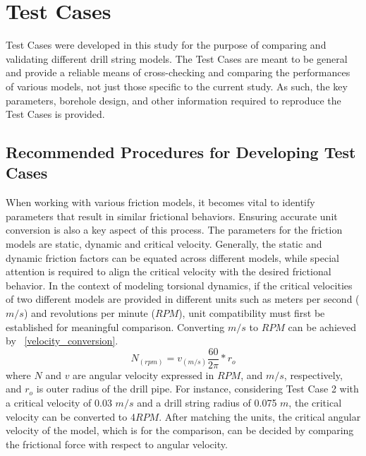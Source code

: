 \chapter{Test Cases}
\label{ch:testcases}
Test Cases were developed in this study for the purpose of comparing and validating different drill string models.  The Test Cases are meant to be general and provide a reliable means of cross-checking and comparing the performances of various models, not just those specific to the current study.  As such, the key parameters, borehole design, and other information required to reproduce the Test Cases is provided.

\section{Recommended Procedures for Developing Test Cases}
\notfinished{}
When working with various friction models, it becomes vital to identify parameters that result in similar frictional behaviors. Ensuring accurate unit conversion is also a key aspect of this process. The parameters for the friction models are static, dynamic and critical velocity. Generally, the static and dynamic friction factors can be equated across different models, while special attention is required to align the critical velocity with the desired frictional behavior. In the context of modeling torsional dynamics, if the critical velocities of two different models are provided in different units such as meters per second ($m/s$) and revolutions per minute ($RPM$), unit compatibility must first be established for meaningful comparison. Converting $m/s$ to $RPM$ can be achieved by \equationname~\ref{velocity_conversion}.
\begin{equation}\label{velocity_conversion}
  N_{(rpm)}=v_{(m/s)}\frac{60}{2\pi}*r_o
\end{equation}
where $N$ and $v$ are angular velocity expressed in $RPM$, and $m/s$, respectively, and $r_o$ is outer radius of the drill pipe. For instance, considering Test Case 2 with a critical velocity of 0.03 $m/s$ and a drill string radius of 0.075 $m$, the critical velocity can be converted to 4$RPM$. After matching the units, the critical angular velocity of the model, which is for the comparison, can be decided by comparing the frictional force with respect to angular velocity.

